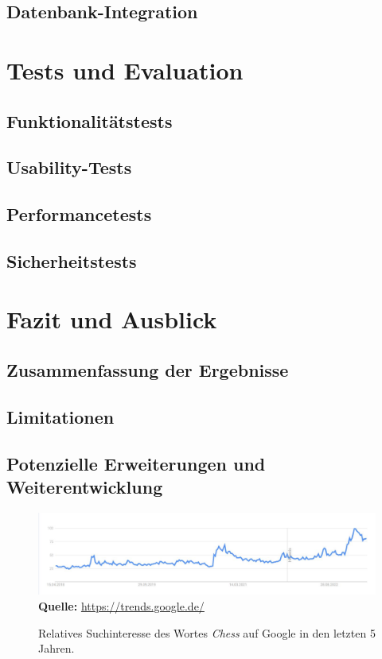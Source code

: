 \documentclass[a4paper,12pt]{report}
\begin{document}
    \section{Datenbank-Integration}

\chapter{Tests und Evaluation}
    \section{Funktionalitätstests}
    \section{Usability-Tests}
    \section{Performancetests}
    \section{Sicherheitstests}

\chapter{Fazit und Ausblick}
    \section{Zusammenfassung der Ergebnisse}
    \section{Limitationen}
    \section{Potenzielle Erweiterungen und Weiterentwicklung}

\appendix

\listoffigures
\begin{figure}[ht]
\raggedleft
  \includegraphics[width=160mm]{Schachentwicklung.jpg}
    \footnotesize\sffamily\textbf{Quelle:} \url{https://trends.google.de/}
  \caption{Relatives Suchinteresse des Wortes \textit{Chess} auf Google in den letzten 5 Jahren.}
  \label{fig:Schachinteresse}
\end{figure}
  
\end{document}

